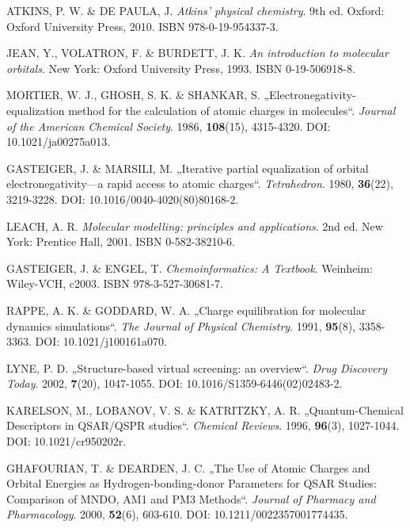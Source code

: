 \begin{thebibliography}{10}

ATKINS, P. W. \& DE PAULA, J. \textit{Atkins' physical chemistry}. 9th ed. Oxford: Oxford University Press, 2010. ISBN 978-0-19-954337-3.

JEAN, Y., VOLATRON, F. \& BURDETT, J. K. \textit{An introduction to molecular orbitals}. New York: Oxford University Press, 1993. ISBN 0-19-506918-8.

MORTIER, W. J., GHOSH, S. K. \& SHANKAR, S. „Electronegativity-equalization method for the calculation of atomic charges in molecules“. \textit{Journal of the American Chemical Society}. 1986, \textbf{108}(15), 4315-4320. DOI: 10.1021/ja00275a013.

GASTEIGER, J. \& MARSILI, M. „Iterative partial equalization of orbital electronegativity—a rapid access to atomic charges“. \textit{Tetrahedron}. 1980, \textbf{36}(22), 3219-3228. DOI: 10.1016/0040-4020(80)80168-2.

LEACH, A. R. \textit{Molecular modelling: principles and applications}. 2nd ed. New York: Prentice Hall, 2001. ISBN 0-582-38210-6.

GASTEIGER, J. \& ENGEL, T. \textit{Chemoinformatics: A Textbook}. Weinheim: Wiley-VCH, c2003. ISBN 978-3-527-30681-7.

RAPPE, A. K. \& GODDARD, W. A. „Charge equilibration for molecular dynamics simulations“. \textit{The Journal of Physical Chemistry}. 1991, \textbf{95}(8), 3358-3363. DOI: 10.1021/j100161a070.

LYNE, P. D. „Structure-based virtual screening: an overview“. \textit{Drug Discovery Today}. 2002, \textbf{7}(20), 1047-1055. DOI: 10.1016/S1359-6446(02)02483-2.

KARELSON, M., LOBANOV, V. S. \& KATRITZKY, A. R. „Quantum-Chemical Descriptors in QSAR/QSPR studies“. \textit{Chemical Reviews}. 1996, \textbf{96}(3), 1027-1044. DOI: 10.1021/cr950202r.

GHAFOURIAN, T. \& DEARDEN, J. C. „The Use of Atomic Charges and Orbital Energies as Hydrogen-bonding-donor Parameters for QSAR Studies: Comparison of MNDO, AM1 and PM3 Methods“. \textit{Journal of Pharmacy and Pharmacology}. 2000, \textbf{52}(6), 603-610. DOI: 10.1211/0022357001774435.


\end{thebibliography}
